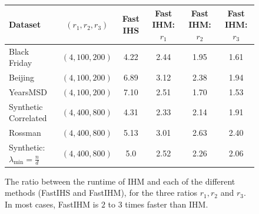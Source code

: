 \documentclass[11pt]{article}
\theoremstyle{definition}
\theoremstyle{plain}
\newcommand{\FastIHM}{\hyperref[alg:private_fast_hessian_sketch]{\texttt{FastIHM}}\xspace}
\begin{document}
\begin{figure}[t]
    \caption{Performance comparison of \FastIHM and IHM. The upper plots are for $\frac{n}{d} \approx 1450$ and the lower for $\frac{n}{d}\approx 16000$. For each dataset, we use three values of $k_2$, represented by $r_1, r_2$, and $r_3$. The plots illustrate the dependence on $\lambda^{X}_{\max}$ and $\lambda^{X}_{\min}$, where smaller $\lambda^{X}_{\max}$ and larger $\lambda^{X}_{\min}$ improve performance. Moreover, in certain cases, \FastIHM matches the performance of IHM.}
  {
    \centering
    \footnotesize
    \setlength{\tabcolsep}{4.2pt}
    \renewcommand{\arraystretch}{1.03}
    \begin{adjustbox}{max width=\textwidth}
    \begin{tabular}{l
                    c
                    S[table-format=1.3]
                    S[table-format=1.3]
                    S[table-format=1.3]
                    S[table-format=1.3]}
    \toprule
    Dataset
    & {$(r_1, r_2, r_3)$}
    & {Fast IHS}
    & {Fast IHM: $r_1$}
    & {Fast IHM: $r_2$}
    & {Fast IHM: $r_3$} \\
    \midrule
    Black Friday
    & $(4,100,200)$ & 4.22 & 2.44 & 1.95 & 1.61 \\
    Beijing
    & $(4,100,200)$ & 6.89 & 3.12 & 2.38 & 1.94 \\
    YearsMSD
    & $(4,100,200)$ & 7.10 & 2.51 & 1.70 & 1.53 \\
    Synthetic Correlated
    & $(4,400,800)$ & 4.31 & 2.33 & 2.14 & 1.91 \\
    Rossman
    & $(4,400,800)$ & 5.13 & 3.01 & 2.63 & 2.40 \\
    Synthetic: $\lambda_{\min} = \frac{n}{d}$
    & $(4,400,800)$ & 5.0 & 2.52 & 2.26 & 2.06 \\
    \bottomrule
    \end{tabular}
    \end{adjustbox}
   }
   \caption{The ratio between the runtime of IHM and each of the different methods (FastIHS and FastIHM), for the three ratios $r_1, r_2$ and $r_3$. In most cases, FastIHM is \(2\) to \(3\) times faster than IHM.}
    \label{fig:main_text_ols}
\end{figure}
\end{document}
